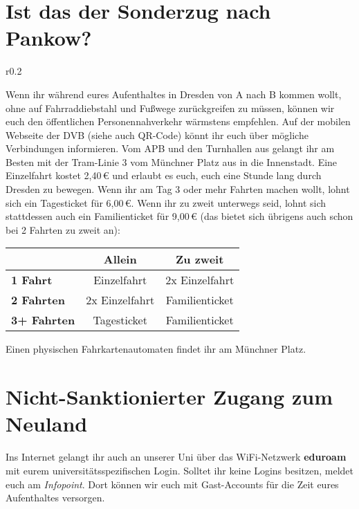 \section*{Ist das der Sonderzug nach Pankow?}

\begin{wrapfigure}[6]{r}{0.2\textwidth}
  \vspace*{-11pt}
  \textcolor{KIFgrey}{}
\end{wrapfigure}

Wenn ihr während eures Aufenthaltes in Dresden von A nach B kommen wollt, ohne auf Fahrraddiebstahl und Fußwege zurückgreifen zu müssen, können wir euch den öffentlichen Personennahverkehr wärmstens empfehlen.
Auf der mobilen Webseite der DVB  (siehe auch QR-Code) könnt ihr euch über mögliche Verbindungen informieren.
Vom APB und den Turnhallen aus gelangt ihr am Besten mit der Tram-Linie 3 vom Münchner Platz aus in die Innenstadt.
Eine Einzelfahrt kostet 2,40\,€ und erlaubt es euch, euch eine Stunde lang durch Dresden zu bewegen. Wenn ihr am Tag 3 oder mehr Fahrten machen wollt, lohnt sich ein Tagesticket für 6,00\,€. Wenn ihr zu zweit unterwegs seid, lohnt sich stattdessen auch ein Familienticket für 9,00\,€ (das bietet sich übrigens auch schon bei 2 Fahrten zu zweit an):

\begin{center}
\begin{tabular}{l | c | c}
& \textbf{Allein} & \textbf{Zu zweit} \\ \hline
\textbf{1 Fahrt} & Einzelfahrt & 2x Einzelfahrt \\ \hline
\textbf{2 Fahrten} & 2x Einzelfahrt & Familienticket \\ \hline
\textbf{3+ Fahrten} & Tagesticket & Familienticket \\
\end{tabular}
\end{center}

Einen physischen Fahrkartenautomaten findet ihr am Münchner Platz.

\section*{Nicht-Sanktionierter Zugang zum Neuland}

Ins Internet gelangt ihr auch an unserer Uni über das WiFi-Netzwerk \textbf{eduroam} mit eurem universitätsspezifischen Login.
Solltet ihr keine Logins besitzen, meldet euch am \emph{Infopoint}.
Dort können wir euch mit Gast-Accounts für die Zeit eures Aufenthaltes versorgen.


